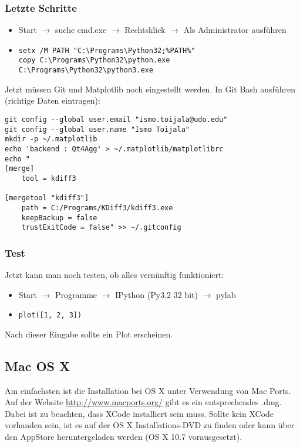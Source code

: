 \subsubsection{Letzte Schritte}
\begin{itemize}
  \item Start $\rightarrow$ suche cmd.exe $\rightarrow$ Rechtsklick $\rightarrow$ Als Administrator ausführen
  \item
\begin{verbatim}
setx /M PATH "C:\Programs\Python32;%PATH%"
copy C:\Programs\Python32\python.exe C:\Programs\Python32\python3.exe
\end{verbatim}
\end{itemize}
Jetzt müssen Git und Matplotlib noch eingestellt werden.
In Git Bash ausführen (richtige Daten eintragen):
\begin{verbatim}
git config --global user.email "ismo.toijala@udo.edu"
git config --global user.name "Ismo Toijala"
mkdir -p ~/.matplotlib
echo 'backend : Qt4Agg' > ~/.matplotlib/matplotlibrc
echo "
[merge]
    tool = kdiff3
    
[mergetool "kdiff3"]
    path = C:/Programs/KDiff3/kdiff3.exe
    keepBackup = false
    trustExitCode = false" >> ~/.gitconfig
\end{verbatim}

\subsubsection{Test}
Jetzt kann man noch testen, ob alles vernünftig funktioniert:
\begin{itemize}
  \item Start $\rightarrow$ Programme $\rightarrow$ IPython (Py3.2 32 bit) $\rightarrow$ pylab
  \item \texttt{plot([1, 2, 3])}
\end{itemize}
Nach dieser Eingabe sollte ein Plot erscheinen.

\subsection{Mac OS X}
Am einfachsten ist die Installation bei OS X unter Verwendung von Mac Ports.
Auf der Website \url{http://www.macports.org/} gibt es ein entsprechendes .dmg.
Dabei ist zu beachten, dass XCode installiert sein muss. Sollte kein XCode vorhanden sein, ist es auf der OS X Installations-DVD zu finden oder kann über den AppStore heruntergeladen werden (OS X 10.7 vorausgesetzt).

